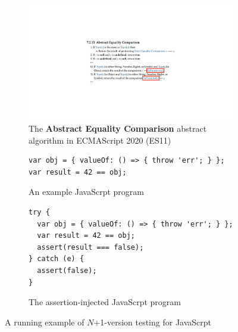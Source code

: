 \begin{figure}[t]
  \centering
  \begin{subfigure}[t]{0.48\textwidth}
    \includegraphics[width=\textwidth]{img/example-algo.pdf}
    \caption{The \textbf{Abstract Equality Comparison} abstract algorithm in
    ECMAScript 2020 (ES11)}
    \label{fig:example-algo}
  \end{subfigure}
  \begin{subfigure}[t]{0.43\textwidth}
    \begin{lstlisting}[style=myJSstyle]
var obj = { valueOf: () => { throw 'err'; } };
var result = 42 == obj;
    \end{lstlisting}
    \caption{An example JavaScrpt program}
    \label{fig:example-js}
  \end{subfigure}
  \begin{subfigure}[t]{0.45\textwidth}
    \begin{lstlisting}[style=myJSstyle]
try {
  var obj = { valueOf: () => { throw 'err'; } };
  var result = 42 == obj;
  assert(result === false);
} catch (e) {
  assert(false);
}
    \end{lstlisting}
    \caption{The assertion-injected JavaScrpt program}
    \label{fig:example-injected}
  \end{subfigure}
  \caption{A running example of $N$+1-version testing for JavaScrpt}
  \label{fig:example}
  \vspace*{-1em}
\end{figure}

